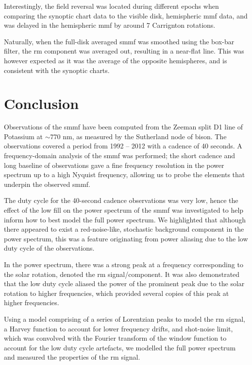 Interestingly, the field reversal was located during different epochs when comparing the synoptic chart data to the visible disk, hemispheric \gls{mmf} data, and was delayed in the hemispheric \gls{mmf} by around 7 Carrignton rotations.

Naturally, when the full-disk averaged \gls{smmf} was smoothed using the box-bar filter, the \gls{rm} component was averaged out, resulting in a near-flat line. This was however expected as it was the average of the opposite hemispheres, and is consistent with the synoptic charts.


\section{Conclusion}\label{sec:SMMF_conclusion}


Observations of the \gls{smmf} have been computed from the Zeeman split D1 line of Potassium at $\sim 770$ nm, as measured by the Sutherland node of \gls{bison}. The observations covered a period from 1992 -- 2012 with a cadence of 40 seconds. A frequency-domain analysis of the \gls{smmf} was performed; the short cadence and long baseline of observations gave a fine frequency resolution in the power spectrum up to a high Nyquist frequency, allowing us to probe the elements that underpin the observed \gls{smmf}.

The duty cycle for the 40-second cadence observations was very low, hence the effect of the low fill on the power spectrum of the \gls{smmf} was investigated to help inform how to best model the full power spectrum. We highlighted that although there appeared to exist a red-noise-like, stochastic background component in the power spectrum, this was a feature originating from power aliasing due to the low duty cycle of the observations.

In the power spectrum, there was a strong peak at a frequency corresponding to the solar rotation, denoted the \gls{rm} signal/component. It was also demonstrated that the low duty cycle aliased the power of the prominent peak due to the solar rotation to higher frequencies, which provided several copies of this peak at higher frequencies.

Using a model comprising of a series of Lorentzian peaks to model the \gls{rm} signal, a Harvey function to account for lower frequency drifts, and shot-noise limit, which was convolved with the Fourier transform of the window function to account for the low duty cycle artefacts, we modelled the full power spectrum and measured the properties of the \gls{rm} signal.

